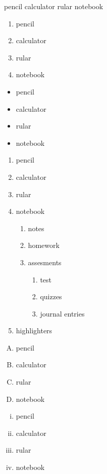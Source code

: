 \documentclass[11pt]{article}
\begin{document}
pencil
calculator
rular
notebook

\begin{enumerate} %
    \item pencil
    \item calculator
    \item rular
    \item notebook
\end{enumerate}

\begin{itemize} %
    \item pencil
    \item calculator
    \item rular
    \item notebook
\end{itemize}

\begin{enumerate} %
    \item pencil
    \item calculator
    \item rular
    \item notebook
        \begin{enumerate}
            \item notes
            \item homework
            \item assesments
                \begin{enumerate}
                    \item test
                    \item quizzes
                    \item journal entries
                \end{enumerate}
        \end{enumerate}
    \item highlighters
\end{enumerate}

\vspace{0.1cm}

\begin{enumerate}[A.] %
    \item pencil
    \item calculator
    \item rular
    \item notebook
\end{enumerate}

\pagebreak

\begin{enumerate}[i.] %
    \item pencil
    \item calculator
    \item rular
    \item notebook
\end{enumerate}
\end{document}

